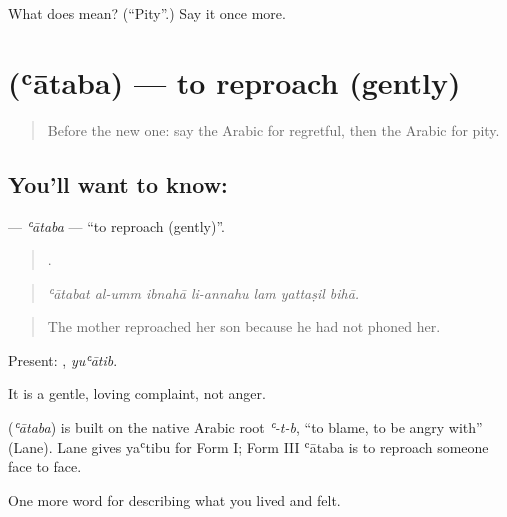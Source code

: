 \begin{tcolorbox}[breakable,colback=teal!4,colframe=teal!35!black,title={Before you move on}]
What does  mean? (\textquotedblleft{}Pity\textquotedblright{}.) Say it once more.
\end{tcolorbox}
\section[\texorpdfstring{\ar{عاتب} (ʿātaba)}{عاتب (ʿātaba)}]{ (ʿātaba) — to reproach (gently)}

\label{lesson:AR-C493-ataba}



\begin{quote}
Before the new one: say the Arabic for regretful, then the Arabic for pity.
\end{quote}

\subsection*{You'll want to know: }
\textbf{} — \emph{ʿātaba} — \textquotedblleft{}to reproach (gently)\textquotedblright{}.

\begin{quote}
      .
\end{quote}

\begin{quote}
\emph{ʿātabat al-umm ibnahā li-annahu lam yattaṣil bihā.}
\end{quote}

\begin{quote}
The mother reproached her son because he had not phoned her.
\end{quote}

Present: , \emph{yuʿātib}.

It is a gentle, loving complaint, not anger.

\begin{cousinweb}
\textbf{} (\emph{ʿātaba}) is built on the native Arabic root \emph{ʿ-t-b}, \textquotedblleft{}to blame, to be angry with\textquotedblright{} (Lane). Lane gives yaʿtibu for Form I; Form III ʿātaba is to reproach someone face to face.
\end{cousinweb}

\begin{grammarlens}[title={What you've built}]
One more word for describing what you lived and felt.
\end{grammarlens}

